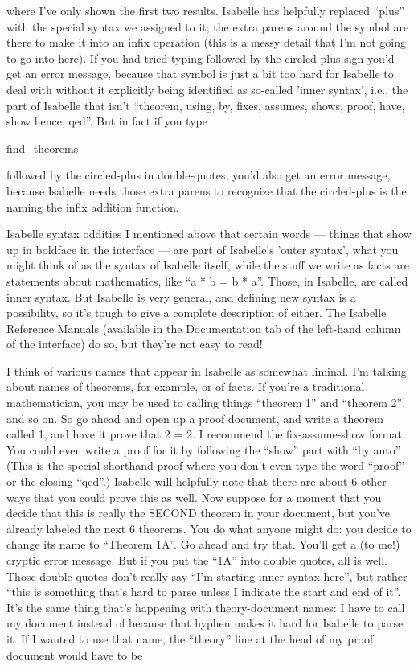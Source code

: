 where I've only shown the first two results. Isabelle has helpfully replaced ``plus'' with the special syntax we assigned to it; the extra parens around the symbol are there to make it into an infix operation (this is a messy detail that I'm not going to go into here). If you had tried typing  followed by the circled-plus-sign
you'd get an error message, because that symbol is just a bit too hard for Isabelle to deal with without it explicitly being identified as so-called 'inner syntax', i.e., the part of Isabelle that isn't ``theorem, using, by, fixes, assumes, shows, proof, have, show hence, qed''. But in fact if you type 
\begin{IS}
find_theorems 
\end{IS}
followed by the circled-plus in double-quotes,
you'd also get an error message, because Isabelle needs those extra parens to recognize that the circled-plus is the naming the infix addition function. 

Isabelle syntax oddities
I mentioned above that certain words --- things that show up in boldface in the interface --- are part of Isabelle's 'outer syntax', what you might think of as the syntax of Isabelle itself, while the stuff we write as facts are statements about mathematics, like ``a * b = b * a''. Those, in Isabelle, are called inner syntax. But Isabelle is very general, and defining new syntax is a possibility, so it's tough to give a complete description of either. The Isabelle Reference Manuals (available in the Documentation tab of the left-hand column of the interface) do so, but they're not easy to read! 

I think of various names that appear in Isabelle as somewhat liminal. I'm talking about names of theorems, for example, or of facts. If you're a traditional mathematician, you may be used to calling things ``theorem 1'' and ``theorem 2'', and so on. So go ahead and open up a proof document, and write a theorem called 1, and have it prove that 2 = 2. I recommend the fix-assume-show format. You could even write a proof for it by following the ``show'' part with ``by auto''  (This is the special shorthand proof where you don't even type the word ``proof'' or the closing ``qed''.) Isabelle will helpfully note that there are about 6 other ways that you could prove this as well. Now suppose for a moment that you decide that this is really the SECOND theorem in your document, but you've already labeled the next 6 theorems. You do what anyone might do: you decide to change its name to ``Theorem 1A''. Go ahead and try that. You'll get a (to me!) cryptic error message. But if you put the ``1A'' into double quotes, all is well. Those double-quotes don't really say ``I'm starting inner syntax here'', but rather ``this is something that's hard to parse unless I indicate the start and end of it''. It's the same thing that's happening with theory-document names: I have to call my document   instead of   because that hyphen makes it hard for Isabelle to parse it. If I wanted to use that name, the ``theory'' line at the head of my proof document would have to be 

